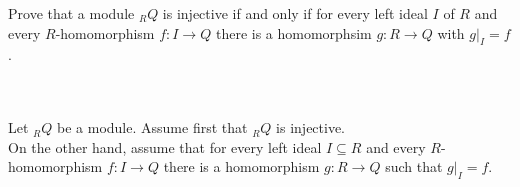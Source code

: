Prove that a module $_RQ$ is injective if and only if for every left ideal $I$ of $R$ and every
$R$-homomorphism $f:I\to Q$ there is a homomorphsim $g:R\to Q$ with $g|_I=f$.\\\\

\begin{solution}\renewcommand{\qedsymbol}{}\ \\
    Let $_RQ$ be a module. Assume first that $_RQ$ is injective.\\
    On the other hand, assume that for every left ideal $I\subseteq R$ and every $R$-homomorphism
    $f:I\to Q$ there is a homomorphism $g:R\to Q$ such that $g|_I=f$.
\end{solution}